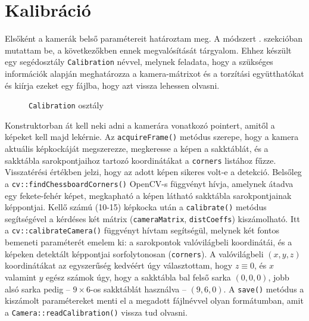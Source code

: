 \section{Kalibráció}

Elsőként a kamerák belső paramétereit határoztam meg. A módszert . szekcióban mutattam be, a következőkben ennek megvalósítását tárgyalom. Ehhez készült egy segédosztály \texttt{Calibration} névvel, melynek feladata, hogy a szükséges információk alapján meghatározza a kamera-mátrixot és a torzítási együtthatókat és kiírja ezeket egy fájlba, hogy azt vissza lehessen olvasni.

\begin{figure}[tbh]
\centering


\caption{\texttt{Calibration} osztály \label{fig:cd:calibration}}
\end{figure}

Konstruktorban át kell neki adni a kamerára vonatkozó pointert, amitől a képeket kell majd lekérnie. Az \texttt{acquireFrame()} metódus szerepe, hogy a kamera aktuális képkockáját megszerezze, megkeresse a képen a sakktáblát, és a sakktábla sarokpontjaihoz tartozó koordinátákat a \texttt{corners} listához fűzze. Visszatérési értékben jelzi, hogy az adott képen sikeres volt-e a detekció. Belsőleg a \texttt{cv::findChessboardCorners()} OpenCV-s függvényt hívja, amelynek átadva egy fekete-fehér képet, megkapható a képen látható sakktábla sarokpontjainak képpontjai. Kellő számú (10-15) képkocka után a \texttt{calibrate()} metódus segítségével a kérdéses két mátrix (\texttt{cameraMatrix}, \texttt{distCoeffs}) kiszámolható. Itt a \texttt{cv::calibrateCamera()} függvényt hívtam segítségül, melynek két fontos bemeneti paraméterét emelem ki: a sarokpontok valóvilágbeli koordinátái, és a képeken detektált képpontjai sorfolytonosan (\texttt{corners}). A valóvilágbeli $(x, y, z)$ koordinátákat az egyszerűség kedvéért úgy választottam, hogy $z \equiv 0$, és $x$ valamint $y$ egész számok úgy, hogy a sakktábla bal felső sarka $(0, 0, 0)$, jobb alsó sarka pedig -- $9\times 6$-os sakktáblát használva -- $(9, 6, 0)$. A \texttt{save()} metódus a kiszámolt paramétereket menti el a megadott fájlnévvel olyan formátumban, amit a \texttt{Camera::readCalibration()} vissza tud olvasni.


